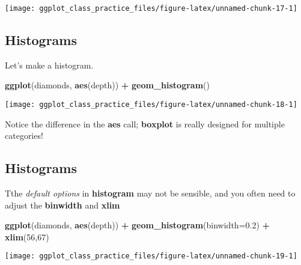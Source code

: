 \documentclass[
]{article}
\newenvironment{Shaded}{\begin{snugshade}}{\end{snugshade}}
\newcommand{\AttributeTok}[1]{\textcolor[rgb]{0.13,0.29,0.53}{#1}}
\newcommand{\DecValTok}[1]{\textcolor[rgb]{0.00,0.00,0.81}{#1}}
\newcommand{\FloatTok}[1]{\textcolor[rgb]{0.00,0.00,0.81}{#1}}
\newcommand{\FunctionTok}[1]{\textcolor[rgb]{0.13,0.29,0.53}{\textbf{#1}}}
\newcommand{\NormalTok}[1]{#1}
\newcommand{\SpecialCharTok}[1]{\textcolor[rgb]{0.81,0.36,0.00}{\textbf{#1}}}
\begin{document}
\begin{center}\texttt{[image: ggplot\_class\_practice\_files/figure-latex/unnamed-chunk-17-1]} \end{center}

\hypertarget{histograms}{%
\subsection{Histograms}\label{histograms}}

Let's make a histogram.

\begin{Shaded}
\begin{Highlighting}[]
\FunctionTok{ggplot}\NormalTok{(diamonds, }\FunctionTok{aes}\NormalTok{(depth)) }\SpecialCharTok{+} \FunctionTok{geom\_histogram}\NormalTok{()}
\end{Highlighting}
\end{Shaded}

\begin{center}\texttt{[image: ggplot\_class\_practice\_files/figure-latex/unnamed-chunk-18-1]} \end{center}

Notice the difference in the \textbf{aes} call; \textbf{boxplot} is
really designed for multiple categories!

\hypertarget{histograms-1}{%
\subsection{Histograms}\label{histograms-1}}

Tthe \emph{default options} in \textbf{histogram} may not be sensible,
and you often need to adjust the \textbf{binwidth} and \textbf{xlim}

\begin{Shaded}
\begin{Highlighting}[]
\FunctionTok{ggplot}\NormalTok{(diamonds, }\FunctionTok{aes}\NormalTok{(depth)) }\SpecialCharTok{+} \FunctionTok{geom\_histogram}\NormalTok{(}\AttributeTok{binwidth=}\FloatTok{0.2}\NormalTok{) }\SpecialCharTok{+} \FunctionTok{xlim}\NormalTok{(}\DecValTok{56}\NormalTok{,}\DecValTok{67}\NormalTok{)}
\end{Highlighting}
\end{Shaded}

\begin{center}\texttt{[image: ggplot\_class\_practice\_files/figure-latex/unnamed-chunk-19-1]} \end{center}
\end{document}
